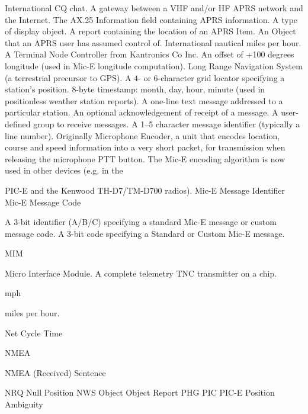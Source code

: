 {International CQ chat.
A gateway between a VHF and/or HF APRS network and the Internet.
The AX.25 Information field containing APRS information.
A type of display object.
A report containing the location of an APRS Item.
An Object that an APRS user has assumed control of.
International nautical miles per hour.
A Terminal Node Controller from Kantronics Co Inc.
An offset of +100 degrees longitude (used in Mic-E longitude computation).
Long Range Navigation System (a terrestrial precursor to GPS).
A 4- or 6-character grid locator specifying a station’s position.
8-byte timestamp: month, day, hour, minute (used in positionless weather station
reports).
A one-line text message addressed to a particular station.
An optional acknowledgement of receipt of a message.
A user-defined group to receive messages.
A 1–5 character message identifier (typically a line number).
Originally Microphone Encoder, a unit that encodes location, course and speed
information into a very short packet, for transmission when releasing the microphone
PTT button. The Mic-E encoding algorithm is now used in other devices (e.g. in the


PIC-E and the Kenwood TH-D7/TM-D700 radios).
Mic-E Message Identifier
Mic-E Message Code

A 3-bit identifier (A/B/C) specifying a standard Mic-E message or custom message
code.
A 3-bit code specifying a Standard or Custom Mic-E message.

MIM

Micro Interface Module. A complete telemetry TNC transmitter on a chip.

mph

miles per hour.

Net Cycle Time

NMEA

NMEA (Received) Sentence

NRQ
Null Position
NWS
Object
Object Report
PHG
PIC
PIC-E
Position Ambiguity

}

